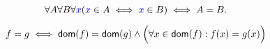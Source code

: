 \begin{frame}{}
  \begin{definition}
    \[
      \forall A \forall B \forall \textcolor{blue}{x} (\textcolor{blue}{x} \in A \iff \textcolor{blue}{x} \in B) \iff A = B.
    \]
  \end{definition}


  \pause
  \vspace{0.80cm}
  \begin{definition}[函数的外延性原则]
    \[
      f = g \iff \textsf{dom}(f) = \textsf{dom}(g) \land \Big(\forall x \in \textsf{dom}(f): f(x) = g(x)\Big)
    \]
  \end{definition}
\end{frame}
